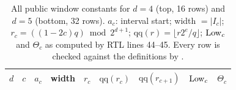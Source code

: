 \begin{table}[p]\centering\scriptsize
\caption{All public window constants for $d = 4$ (top, 16 rows) and $d = 5$ (bottom, 32 rows). $a_c$: interval start; width $= |I_c|$; $r_c = ((1-2c)q) \bmod 2^{d+1}$; $\mathrm{qq}(r) = \lfloor r 2^e/q \rfloor$; $\mathrm{Low}_c$ and $\Theta_c$ as computed by RTL lines 44--45. Every row is checked against the definitions by .}\label{tab:windows}
\begin{tabular}{@{}rrrrrrrrr@{}}
\toprule
$d$ & $c$ & $a_c$ & width & $r_c$ & $\mathrm{qq}(r_c)$ & $\mathrm{qq}(r_{c+1})$ & $\mathrm{Low}_c$ & $\Theta_c$ \\
\midrule

\end{tabular}
\end{table}
